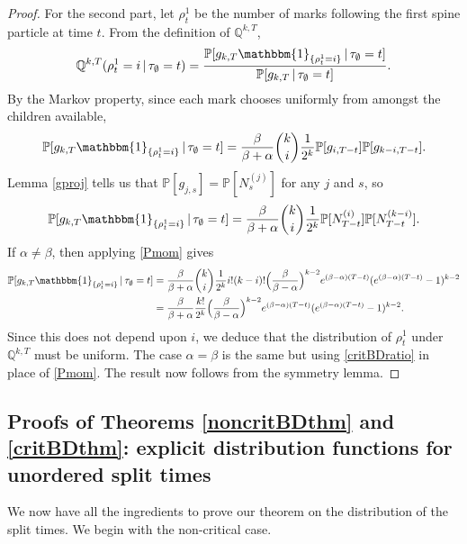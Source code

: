 \documentclass{article}
\theoremstyle{plain}
\theoremstyle{definition}
\newcommand{\Q}{\mathbb{Q}}
\renewcommand{\P}{\mathbb{P}}
\newcommand{\ind}{\mathbbm{1}}
\begin{document}
\begin{proof}
For the second part, let $\rho^1_t$ be the number of marks following the first spine particle at time $t$. From the definition of $\Q^{k,T}$,
\[\Q^{k,T}(\rho^1_t = i\,|\,\tau_\emptyset=t) = \frac{\P[g_{k,T}\ind_{\{\rho^1_t = i\}}\,|\,\tau_\emptyset=t]}{\P[g_{k,T}\,|\,\tau_\emptyset=t]}.\]
By the Markov property, since each mark chooses uniformly from amongst the children available,
\[\P[g_{k,T}\ind_{\{\rho^1_t = i\}}\,|\,\tau_\emptyset=t] = \frac{\beta}{\beta+\alpha}\binom{k}{i}\frac{1}{2^k} \P[g_{i,T-t}]\P[g_{k-i,T-t}].\]
Lemma \ref{gproj} tells us that $\P[g_{j,s}] = \P[N^{(j)}_s]$ for any $j$ and $s$, so
\[\P[g_{k,T}\ind_{\{\rho^1_t = i\}}\,|\,\tau_\emptyset=t] = \frac{\beta}{\beta+\alpha}\binom{k}{i}\frac{1}{2^k} \P[N^{(i)}_{T-t}]\P[N^{(k-i)}_{T-t}].\]
If $\alpha\neq\beta$, then applying \eqref{Pmom} gives
\begin{align*}
\P[g_{k,T}\ind_{\{\rho^1_t = i\}}\,|\,\tau_\emptyset=t] &= \frac{\beta}{\beta+\alpha}\binom{k}{i}\frac{1}{2^k} i!(k-i)!\Big(\frac{\beta}{\beta-\alpha}\Big)^{k-2}e^{(\beta-\alpha)(T-t)}(e^{(\beta-\alpha)(T-t)}-1)^{k-2}\\
&= \frac{\beta}{\beta+\alpha}\frac{k!}{2^k} \Big(\frac{\beta}{\beta-\alpha}\Big)^{k-2}e^{(\beta-\alpha)(T-t)}(e^{(\beta-\alpha)(T-t)}-1)^{k-2}.
\end{align*}
Since this does not depend upon $i$, we deduce that the distribution of $\rho^1_t$ under $\Q^{k,T}$ must be uniform. The case $\alpha=\beta$ is the same but using \eqref{critBDratio} in place of \eqref{Pmom}. The result now follows from the symmetry lemma.
\end{proof}




\subsection{Proofs of Theorems \ref{noncritBDthm} and \ref{critBDthm}: explicit distribution functions for unordered split times}

We now have all the ingredients to prove our theorem on the distribution of the split times. We begin with the non-critical case.
\end{document}
